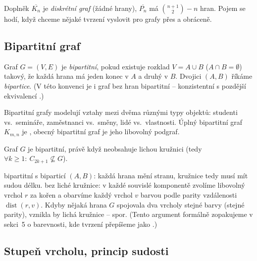 \documentclass[11pt,a4paper]{article}
\DeclareMathOperator{\dist}{dist}
\newcommand{\chrom}{\chi}
\begin{document}
\begin{poznamka}
Doplněk $\overline{K_n}$ je \emph{diskrétní graf} (žádné hrany), $\overline{P_n}$ má $\binom{n+1}{2}-n$ hran. Pojem se hodí, když chceme nějaké tvrzení vyslovit pro  grafy přes  a obráceně.
\end{poznamka}

\subsection{Bipartitní graf}

\begin{definice}
Graf $G=(V,E)$ je \emph{bipartitní}, pokud existuje rozklad $V=A\cup B$ ($A\cap B=\emptyset$) takový, že každá hrana má jeden konec v $A$ a druhý v $B$. Dvojici $(A,B)$ říkáme \emph{bipartice}. (V této konvenci je i graf bez hran bipartitní -- konzistentní s pozdější ekvivalencí \uv{$\chrom(G)\le 2\iff G$ bipartitní}.)
\end{definice}

\begin{intuice}
Bipartitní grafy modelují vztahy mezi dvěma různými typy objektů: studenti vs.\ semináře, zaměstnanci vs.\ směny, lidé vs.\ vlastnosti. Úplný bipartitní graf $K_{m,n}$ je , obecný bipartitní graf je jeho libovolný podgraf.
\end{intuice}

\begin{veta}
Graf $G$ je bipartitní, právě když neobsahuje lichou kružnici (tedy $\forall k\ge 1:\ C_{2k+1}\not\subseteq G$).
\end{veta}

\begin{intuice}
 bipartitní s biparticí $(A,B)$: každá hrana mění stranu, kružnice tedy musí mít sudou délku.  bez liché kružnice: v každé souvislé komponentě zvolíme libovolný vrchol $r$ za kořen a obarvíme každý vrchol $v$ barvou podle parity vzdálenosti $\dist(r,v)$. Kdyby nějaká hrana $G$ spojovala dva vrcholy stejné barvy (stejné parity), vznikla by lichá kružnice -- spor. (Tento argument formálně zopakujeme v sekci~5 o barevnosti, kde tvrzení přepíšeme jako \uv{$\chrom(G)\le 2$}.)
\end{intuice}

\subsection{Stupeň vrcholu, princip sudosti}
\end{document}
